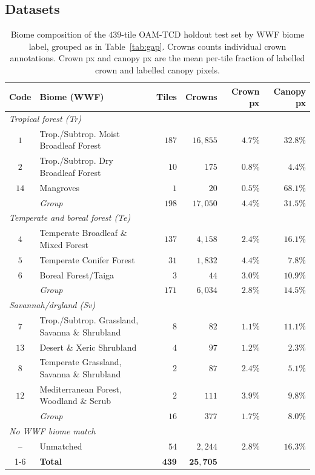 \documentclass[remotesensing,article,submit,moreauthors]{Definitions/mdpi}
\begin{document}
\subsection{Datasets}
\label{app:datasets}

\begin{table}[H]
\centering
\caption{Biome composition of the $439$-tile OAM-TCD holdout test set by WWF biome label, grouped as in Table~\ref{tab:gap}. Crowns counts individual crown annotations. Crown px and canopy px are the mean per-tile fraction of labelled crown and labelled canopy pixels.}
\label{tab:test-biomes}
\small\setlength{\tabcolsep}{3pt}
\begin{tabular}{@{}clrrrr@{}}
\toprule
Code & Biome (WWF) & Tiles & Crowns & Crown px & Canopy px \\
\midrule
\multicolumn{6}{l}{\emph{Tropical forest (Tr)}} \\
$1$ & Trop./Subtrop. Moist Broadleaf Forest & $187$ & $16{,}855$ & $4.7\%$ & $32.8\%$ \\
$2$ & Trop./Subtrop. Dry Broadleaf Forest & $10$ & $175$ & $0.8\%$ & $4.4\%$ \\
$14$ & Mangroves & $1$ & $20$ & $0.5\%$ & $68.1\%$ \\
 & \emph{Group} & $198$ & $17{,}050$ & $4.4\%$ & $31.5\%$ \\
\midrule
\multicolumn{6}{l}{\emph{Temperate and boreal forest (Te)}} \\
$4$ & Temperate Broadleaf \& Mixed Forest & $137$ & $4{,}158$ & $2.4\%$ & $16.1\%$ \\
$5$ & Temperate Conifer Forest & $31$ & $1{,}832$ & $4.4\%$ & $7.8\%$ \\
$6$ & Boreal Forest/Taiga & $3$ & $44$ & $3.0\%$ & $10.9\%$ \\
 & \emph{Group} & $171$ & $6{,}034$ & $2.8\%$ & $14.5\%$ \\
\midrule
\multicolumn{6}{l}{\emph{Savannah/dryland (Sv)}} \\
$7$ & Trop./Subtrop. Grassland, Savanna \& Shrubland & $8$ & $82$ & $1.1\%$ & $11.1\%$ \\
$13$ & Desert \& Xeric Shrubland & $4$ & $97$ & $1.2\%$ & $2.3\%$ \\
$8$ & Temperate Grassland, Savanna \& Shrubland & $2$ & $87$ & $2.4\%$ & $5.1\%$ \\
$12$ & Mediterranean Forest, Woodland \& Scrub & $2$ & $111$ & $3.9\%$ & $9.8\%$ \\
 & \emph{Group} & $16$ & $377$ & $1.7\%$ & $8.0\%$ \\
\midrule
\multicolumn{6}{l}{\emph{No WWF biome match}} \\
-- & Unmatched & $54$ & $2{,}244$ & $2.8\%$ & $16.3\%$ \\
\cmidrule(lr){1-6}
 & \textbf{Total} & $\mathbf{439}$ & $\mathbf{25{,}705}$ & & \\
\bottomrule
\end{tabular}
\end{table}
\end{document}
